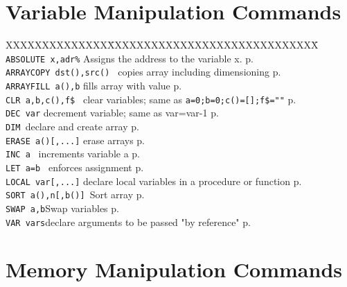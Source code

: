 \section{Variable Manipulation Commands}

\begin{tabbing}
XXXXXXXXXXXXXX\=XXXXXXXXXXXXXXXXXXXXXXXXXXXXX\=\kill\\

\verb|ABSOLUTE x,adr%|\> Assigns the address to the variable x.\> p.\pageref{ABSOLUTE}\\
{\tt ARRAYCOPY dst(),src() }\> copies array including dimensioning\> p.\pageref{ARRAYCOPY}\\
\verb|ARRAYFILL a(),b|\> fills array with value\> p.\pageref{ARRAYFILL}\\
{\tt CLR a,b,c(),f\$ }	\> clear variables; same as \verb|a=0;b=0;c()=[];f$=""|\> p.\pageref{CLR}\\
\verb|DEC var|          \> decrement variable; same as var=var-1\> p.\pageref{DEC} \\
{\tt DIM		 }\>declare and create array\> p.\pageref{DIM} \\
{\tt ERASE a()[,...]}\> erase arrays\> p.\pageref{ERASE} \\
{\tt INC a  		}\> increments variable a\> p.\pageref{INC} \\
{\tt LET a=b 		}\> enforces assignment\> p.\pageref{LET} \\
{\tt LOCAL var[,...]}\> declare local variables in a procedure or function\> p.\pageref{LOCAL} \\	 
{\tt SORT a(),n[,b()]	}\>Sort array\> p.\pageref{SORT} \\
{\tt SWAP a,b}\>Swap variables\> p.\pageref{SWAP} \\
{\tt VAR vars}\>declare arguments to be passed "by reference"\> p.\pageref{VAR} \\
\end{tabbing}

\section{Memory Manipulation Commands}

